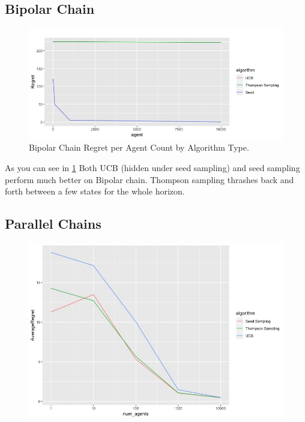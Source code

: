 \documentclass[final]{beamer}
\begin{document}
\begin{frame}[t]
\begin{multicols}{3}
\subsection{Bipolar Chain}
\begin{figure}[htbp!]
  \centering
\includegraphics[scale=.75]{../project_update/results_pre.jpeg}

  \caption{Bipolar Chain Regret per Agent Count by Algorithm Type.}
 \label{fig:bipolarregretperagentbyalgo}
\end{figure}
As you can see in \ref{fig:bipolarregretperagentbyalgo} Both UCB (hidden under seed sampling) and seed sampling perform much better on Bipolar chain. Thompson sampling thrashes back and forth between a few states for the whole horizon.

\subsection{Parallel Chains}
\begin{figure}[htbp!]
  \centering
\includegraphics[scale=.75]{../project_update/pc_results_regret_by_algo.jpg}


\end{figure}
\end{multicols}
\end{frame}
\end{document}
